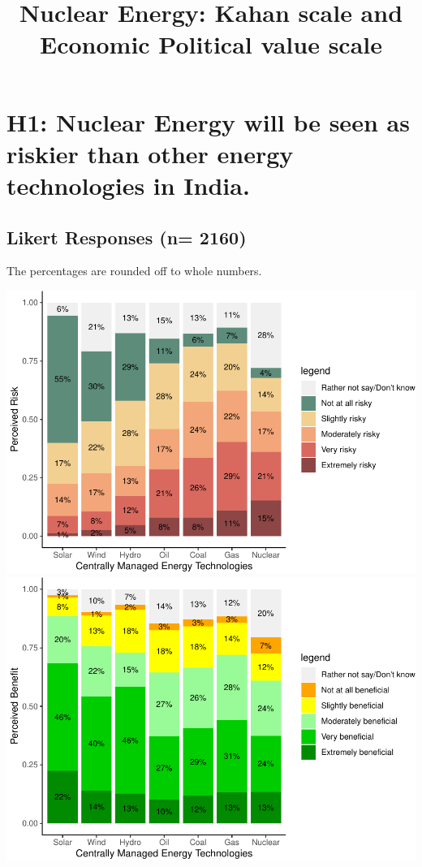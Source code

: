 \documentclass[
]{article}
\title{Nuclear Energy: Kahan scale and Economic Political value scale}
\author{}
\date{\vspace{-2.5em}}
\begin{document}
\maketitle

{
\setcounter{tocdepth}{2}
\tableofcontents
}
\newpage

\hypertarget{h1-nuclear-energy-will-be-seen-as-riskier-than-other-energy-technologies-in-india.}{%
\section{H1: Nuclear Energy will be seen as riskier than other energy
technologies in
India.}\label{h1-nuclear-energy-will-be-seen-as-riskier-than-other-energy-technologies-in-india.}}

\hypertarget{likert-responses-n-2160}{%
\subsection{Likert Responses (n= 2160)}\label{likert-responses-n-2160}}

The percentages are rounded off to whole numbers.

\includegraphics{Paper1_files/figure-latex/unnamed-chunk-5-1.pdf}
\includegraphics{Paper1_files/figure-latex/unnamed-chunk-5-2.pdf}
\end{document}
